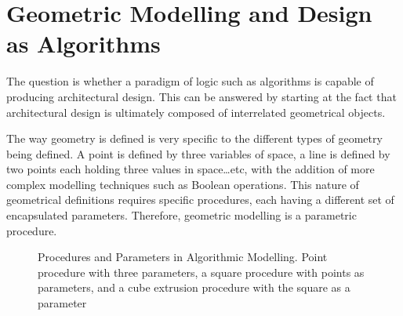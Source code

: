 \section{Geometric Modelling and Design as Algorithms}

The question is whether a paradigm of logic such as algorithms is capable of producing architectural
design. This can be answered by starting at the fact that architectural design is ultimately
composed of interrelated geometrical objects.

The way geometry is defined is very specific to the different types of geometry being defined. A
point is defined by three variables of space, a line is defined by two points each holding three
values in space\ldots etc, with the addition of more complex modelling techniques such as Boolean
operations. This nature of geometrical definitions requires specific procedures, each having a
different set of encapsulated parameters. Therefore, geometric modelling is a parametric
procedure. \cite{hernandez06}

\begin{figure}[htbp]
\flushleft
{}
\centering
\vspace{5mm}
\caption[Procedures and Parameters in Algorithmic Modelling]{Procedures and Parameters in
Algorithmic Modelling. {\footnotesize Point procedure with three parameters, a square procedure with
points as parameters, and a cube extrusion procedure with the square as a parameter}}
\label{SqrAnalysis}
\end{figure}

